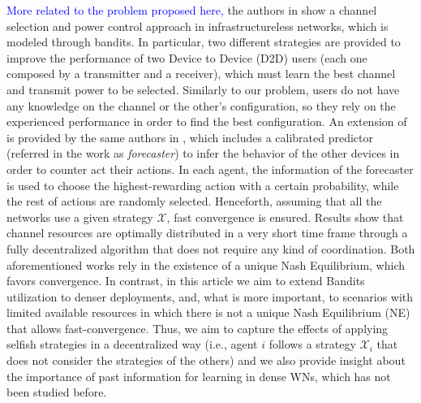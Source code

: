 \documentclass[preprint,12pt]{elsarticle}
\newcommand{\francesc}[1]{\textcolor{blue}{#1}}
\begin{document}
\francesc{More related to the problem proposed here,} the authors in \cite{maghsudi2015joint} show a channel selection and power control approach in infrastructureless networks, which is modeled through bandits. In particular, two different strategies are provided to improve the performance of two Device to Device (D2D) users (each one composed by a transmitter and a receiver), which must learn the best channel and transmit power to be selected. Similarly to our problem, users do not have any knowledge on the channel or the other's configuration, so they rely on the experienced performance in order to find the best configuration. An extension of \cite{maghsudi2015joint} is provided by the same authors in \cite{maghsudi2015channel}, which includes a calibrated predictor (referred in the work as \textit{forecaster}) to infer the behavior of the other devices in order to counter act their actions. In each agent, the information of the forecaster is used to choose the highest-rewarding action with a certain probability, while the rest of actions are randomly selected. Henceforth, assuming that all the networks use a given strategy $\mathcal{X}$, fast convergence is ensured. Results show that channel resources are optimally distributed in a very short time frame through a fully decentralized algorithm that does not require any kind of coordination. Both aforementioned works rely in the existence of a unique Nash Equilibrium, which favors convergence. In contrast, in this article we aim to extend Bandits utilization to denser deployments, and, what is more important, to scenarios with limited available resources in which there is not a unique Nash Equilibrium (NE) that allows fast-convergence. Thus, we aim to capture the effects of applying selfish strategies in a decentralized way (i.e., agent $i$ follows a strategy $\mathcal{X}_i$ that does not consider the strategies of the others) and we also provide insight about the importance of past information for learning in dense WNs, which has not been studied before.

\end{document}
